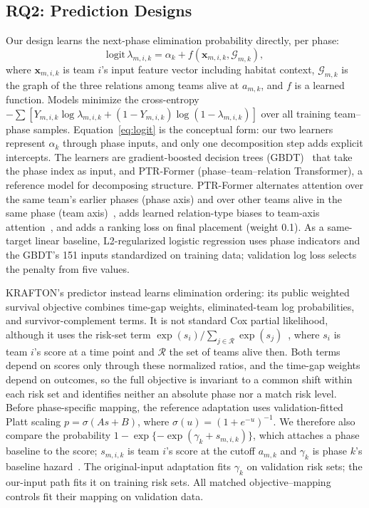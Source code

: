 \documentclass[sigconf,anonymous,nonacm]{acmart}
\begin{document}
\subsection{RQ2: Prediction Designs}
\label{sec:method:rq2}
Our design learns the next-phase elimination probability directly, per phase:
\begin{equation}
\mathrm{logit}\,\lambda_{m,i,k}=\alpha_k+f(\mathbf{x}_{m,i,k},\mathcal{G}_{m,k}),
\label{eq:logit}
\end{equation}
where $\mathbf{x}_{m,i,k}$ is team $i$'s input feature vector including habitat context, $\mathcal{G}_{m,k}$ is the graph of the three relations among teams alive at $a_{m,k}$, and $f$ is a learned function.
Models minimize the cross-entropy $-\sum[Y_{m,i,k}\log\lambda_{m,i,k}+(1-Y_{m,i,k})\log(1-\lambda_{m,i,k})]$ over all training team--phase samples.
Equation~\eqref{eq:logit} is the conceptual form: our two learners represent $\alpha_k$ through phase inputs, and only one decomposition step adds explicit intercepts. The learners are gradient-boosted decision trees (GBDT)~\cite{Friedman01} that take the phase index as input, and PTR-Former (phase--team--relation Transformer), a reference model for decomposing structure.
PTR-Former alternates attention over the same team's earlier phases (phase axis) and over other teams alive in the same phase (team axis)~\cite{Vaswani17}, adds learned relation-type biases to team-axis attention~\cite{Ying21}, and adds a ranking loss on final placement (weight 0.1). As a same-target linear baseline, L2-regularized logistic regression uses phase indicators and the GBDT's 151 inputs standardized on training data; validation log loss selects the penalty from five values.

KRAFTON's predictor instead learns elimination ordering: its public weighted survival objective combines time-gap weights, eliminated-team log probabilities, and survivor-complement terms. It is not standard Cox partial likelihood, although it uses the risk-set term $\exp(s_i)/\sum_{j\in\mathcal{R}}\exp(s_j)$~\cite{Cox72}, where $s_i$ is team $i$'s score at a time point and $\mathcal{R}$ the set of teams alive then.
Both terms depend on scores only through these normalized ratios, and the time-gap weights depend on outcomes, so the full objective is invariant to a common shift within each risk set and identifies neither an absolute phase nor a match risk level. Before phase-specific mapping, the reference adaptation uses validation-fitted Platt scaling $p=\sigma(A s+B)$, where $\sigma(u)=(1+e^{-u})^{-1}$.
We therefore also compare the probability $1-\exp\{-\exp(\gamma_k+s_{m,i,k})\}$, which attaches a phase baseline to the score; $s_{m,i,k}$ is team $i$'s score at the cutoff $a_{m,k}$ and $\gamma_k$ is phase $k$'s baseline hazard~\cite{PrenticeGloeckler78}. The original-input adaptation fits $\gamma_k$ on validation risk sets; the our-input path fits it on training risk sets. All matched objective--mapping controls fit their mapping on validation data.
\end{document}
